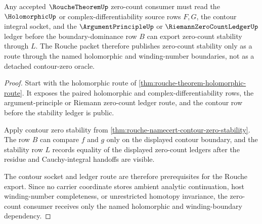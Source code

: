 \begin{theorem}
\label{thm:rouche-theorem-holomorphic-winding-dependency}
Any accepted $\RoucheTheoremUp$ zero-count consumer must read the $\HolomorphicUp$ or complex-differentiability source rows $F,G$, the contour integral socket, and the $\ArgumentPrincipleUp$ or $\RiemannZeroCountLedgerUp$ ledger before the boundary-dominance row $B$ can export zero-count stability through $L$. The Rouche packet therefore publishes zero-count stability only as a route through the named holomorphic and winding-number boundaries, not as a detached contour-zero oracle.
\end{theorem}
\begin{proof}
Start with the holomorphic route of \autoref{thm:rouche-theorem-holomorphic-route}. It exposes the paired holomorphic and complex-differentiability rows, the argument-principle or Riemann zero-count ledger route, and the contour row before the stability ledger is public.

Apply contour zero stability from \autoref{thm:rouche-namecert-contour-zero-stability}. The row $B$ can compare $f$ and $g$ only on the displayed contour boundary, and the stability row $L$ records equality of the displayed zero-count ledgers after the residue and Cauchy-integral handoffs are visible.

The contour socket and ledger route are therefore prerequisites for the Rouche export. Since no carrier coordinate stores ambient analytic continuation, host winding-number completeness, or unrestricted homotopy invariance, the zero-count consumer receives only the named holomorphic and winding-boundary dependency.
\end{proof}




